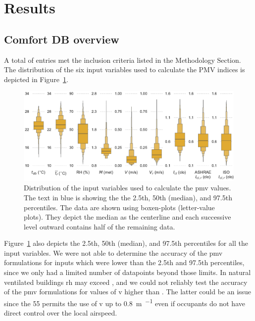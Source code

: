 

\section{Results}\label{sec:results}

\subsection{Comfort DB overview}\label{subsec:comfort-db-overview}

A total of  entries met the inclusion criteria listed in the Methodology Section.
The distribution of the six input variables used to calculate the PMV indices is depicted in Figure~\ref{fig:dist_input_data}.

\begin{figure}[htb!]
    \centering
    \includegraphics[width=\textwidth]{figures/dist_input_data}
    \caption{Distribution of the input variables used to calculate the \ac{pmv} values.
    The text in blue is showing the the 2.5th, 50th (median), and 97.5th percentiles.
    The data are shown using boxen-plots (letter-value plots).
    They depict the median as the centerline and each successive level outward contains half of the remaining data.}
    \label{fig:dist_input_data}
\end{figure}

Figure~\ref{fig:dist_input_data} also depicts the 2.5th, 50th (median), and 97.5th percentiles for all the input variables.
We were not able to determine the accuracy of the \ac{pmv} formulations for inputs which were lower than the 2.5th and 97.5th percentiles, since we only had a limited number of datapoints beyond those limits.
In natural ventilated buildings \ac{rh} may exceed , and we could not reliably test the accuracy of the \ac{pmv} formulations for values of \ac{v} higher than .
The latter could be an issue since the \gls{55} permits the use of \ac{v} up to \qty{0.8}{\m\per\sec} even if occupants do not have direct control over the local airspeed.


